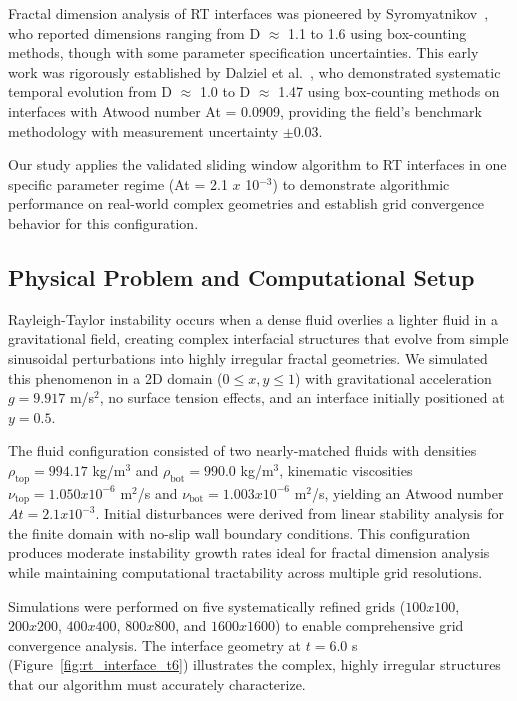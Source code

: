 \documentclass[preprint,12pt]{elsarticle}
\def\times{x}%
\begin{document}
Fractal dimension analysis of RT interfaces was pioneered by Syromyatnikov~\cite{syromyatnikov1993}, who reported dimensions ranging from D $\approx$ 1.1 to 1.6 using box-counting methods, though with some parameter specification uncertainties. This early work was rigorously established by Dalziel et al.~\cite{dalziel1999}, who demonstrated systematic temporal evolution from D $\approx$ 1.0 to D $\approx$ 1.47 using box-counting methods on interfaces with Atwood number At = 0.0909, providing the field's benchmark methodology with measurement uncertainty $\pm$0.03.

Our study applies the validated sliding window algorithm to RT interfaces in one specific parameter regime (At = 2.1 $\times$ 10$^{-3}$) to demonstrate algorithmic performance on real-world complex geometries and establish grid convergence behavior for this configuration.

\subsection{Physical Problem and Computational Setup}
\label{subsec:rt_setup}

Rayleigh-Taylor instability occurs when a dense fluid overlies a lighter fluid in a gravitational field, creating complex interfacial structures that evolve from simple sinusoidal perturbations into highly irregular fractal geometries. We simulated this phenomenon in a 2D domain ($0 \leq x,y \leq 1$) with gravitational acceleration $g = 9.917$ m/s$^2$, no surface tension effects, and an interface initially positioned at $y = 0.5$.

The fluid configuration consisted of two nearly-matched fluids with densities $\rho_{\text{top}} = 994.17$ kg/m$^3$ and $\rho_{\text{bot}} = 990.0$ kg/m$^3$, kinematic viscosities $\nu_{\text{top}} = 1.050 \times 10^{-6}$ m$^2$/s and $\nu_{\text{bot}} = 1.003 \times 10^{-6}$ m$^2$/s, yielding an Atwood number $At = 2.1 \times 10^{-3}$. Initial disturbances were derived from linear stability analysis for the finite domain with no-slip wall boundary conditions. This configuration produces moderate instability growth rates ideal for fractal dimension analysis while maintaining computational tractability across multiple grid resolutions.

Simulations were performed on five systematically refined grids ($100 \times 100$, $200 \times 200$, $400 \times 400$, $800 \times 800$, and $1600 \times 1600$) to enable comprehensive grid convergence analysis. The interface geometry at $t = 6.0$ s (Figure~\ref{fig:rt_interface_t6}) illustrates the complex, highly irregular structures that our algorithm must accurately characterize.
\end{document}
